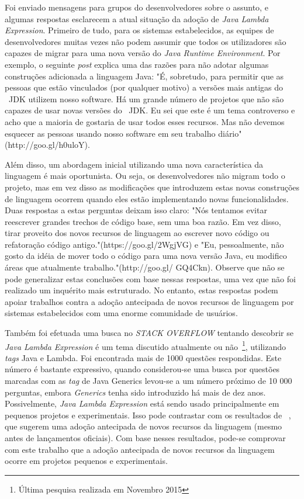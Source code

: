 Foi enviado mensagens para grupos do desenvolvedores sobre o assunto, e algumas respostas esclarecem a atual situação da adoção de \textit{Java Lambda Expression}. Primeiro de tudo, para os sistemas estabelecidos, as equipes de desenvolvedores muitas vezes não podem assumir que todos os utilizadores são capazes de migrar para uma nova versão do \textit{Java Runtime Environment}. Por exemplo, o seguinte \textit{post} explica uma das razões para não adotar algumas construções adicionada a linguagem Java: "É, sobretudo, para permitir que as pessoas que estão vinculados (por qualquer motivo) a versões mais antigas do ~\acs{JDK} utilizem nosso software. Há um grande número de projetos que não são capazes de usar novas versões do ~\acs{JDK}. Eu sei que este é um tema controverso e acho que a maioria de gostaria de usar todos esses recursos. Mas não devemos esquecer as pessoas usando nosso software em seu trabalho diário" (http://goo.gl/h0uloY).

Além disso, um abordagem inicial utilizando uma nova característica da linguagem é mais oportunista. Ou seja, os desenvolvedores não migram todo o projeto, mas em vez disso as modificações que introduzem estas novas construções de linguagem ocorrem quando eles estão implementando novas funcionalidades. Duas respostas a estas perguntas deixam isso claro: "Nós tentamos evitar reescrever grandes trechos de código base, sem uma boa razão. Em vez disso, tirar proveito dos novos recursos de linguagem ao escrever novo código ou refatoração código antigo."(https://goo.gl/2WgjVG) e "Eu, pessoalmente, não gosto da idéia de mover todo o código para uma nova versão Java, eu modifico áreas que atualmente trabalho."(http://goo.gl/ GQ4Ckn). Observe que não se pode generalizar estas conclusões com base nessas respostas, uma vez que não foi realizado um inquérito mais estruturado. No entanto, estas respostas podem apoiar trabalhos contra a adoção antecipada de novos recursos de linguagem por sistemas estabelecidos com uma enorme comunidade de usuários.

Também foi efetuada uma busca no \textit{STACK OVERFLOW} tentando descobrir se \textit{Java Lambda Expression} é um tema discutido atualmente ou não~\footnote{Última pesquisa realizada em Novembro 2015}, utilizando \textit{tags} Java e Lambda. Foi encontrada mais de 1000 questões respondidas. Este número é bastante expressivo, quando considerou-se uma busca por questões marcadas com as \textit{tag} de Java Generics levou-se a um número próximo de 10 000 perguntas, embora \textit{Generics} tenha sido introduzido há mais de dez anos. Possivelmente, \textit{Java Lambda Expression} está sendo usado principalmente em pequenos projetos e experimentais. Isso pode contrastar com os resultados de ~\cite{Dyer:ACM2014}, que sugerem uma adoção antecipada de novos recursos da linguagem (mesmo antes de lançamentos oficiais). Com base nesses resultados, pode-se comprovar com este trabalho que a adoção antecipada de novos recursos da linguagem ocorre em projetos pequenos e experimentais.

